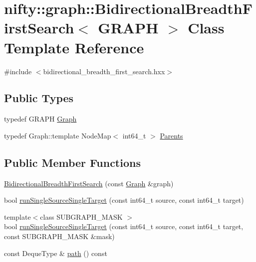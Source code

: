 \hypertarget{classnifty_1_1graph_1_1BidirectionalBreadthFirstSearch}{}\section{nifty\+:\+:graph\+:\+:Bidirectional\+Breadth\+First\+Search$<$ G\+R\+A\+P\+H $>$ Class Template Reference}
\label{classnifty_1_1graph_1_1BidirectionalBreadthFirstSearch}


{\ttfamily \#include $<$bidirectional\+\_\+breadth\+\_\+first\+\_\+search.\+hxx$>$}

\subsection*{Public Types}
\begin{DoxyCompactItemize}
\item 
typedef G\+R\+A\+P\+H \hyperlink{classnifty_1_1graph_1_1BidirectionalBreadthFirstSearch_af6a0e7af586af4ebba7a5f464d82ae71}{Graph}
\item 
typedef Graph\+::template Node\+Map$<$ int64\+\_\+t $>$ \hyperlink{classnifty_1_1graph_1_1BidirectionalBreadthFirstSearch_a8dad356a684976bd3651d63765e35103}{Parents}
\end{DoxyCompactItemize}
\subsection*{Public Member Functions}
\begin{DoxyCompactItemize}
\item 
\hyperlink{classnifty_1_1graph_1_1BidirectionalBreadthFirstSearch_a0190f62ab6974d4d09db4488561605d2}{Bidirectional\+Breadth\+First\+Search} (const \hyperlink{classnifty_1_1graph_1_1BidirectionalBreadthFirstSearch_af6a0e7af586af4ebba7a5f464d82ae71}{Graph} \&graph)
\item 
bool \hyperlink{classnifty_1_1graph_1_1BidirectionalBreadthFirstSearch_af6ae063fd07eb6635ebc070dac6d2730}{run\+Single\+Source\+Single\+Target} (const int64\+\_\+t source, const int64\+\_\+t target)
\item 
{\footnotesize template$<$class S\+U\+B\+G\+R\+A\+P\+H\+\_\+\+M\+A\+S\+K $>$ }\\bool \hyperlink{classnifty_1_1graph_1_1BidirectionalBreadthFirstSearch_a4ddc85ac7f5b28bec9f729d0120b4692}{run\+Single\+Source\+Single\+Target} (const int64\+\_\+t source, const int64\+\_\+t target, const S\+U\+B\+G\+R\+A\+P\+H\+\_\+\+M\+A\+S\+K \&mask)
\item 
const Deque\+Type \& \hyperlink{classnifty_1_1graph_1_1BidirectionalBreadthFirstSearch_a1820fb29cd0d00c04ca660e375d3610a}{path} () const 
\end{DoxyCompactItemize}


